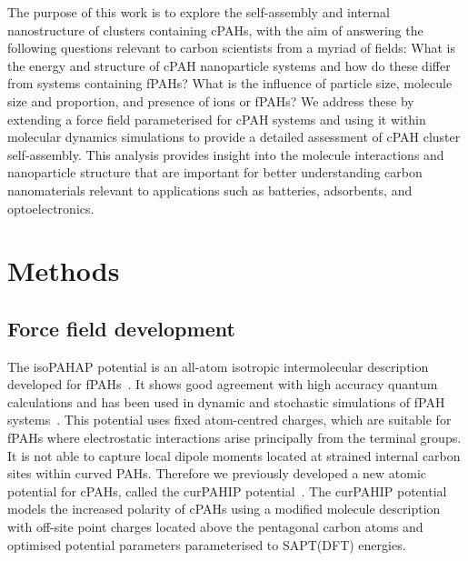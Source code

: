 The purpose of this work is to explore the self-assembly and internal nanostructure of clusters containing cPAHs, with the aim of answering the following questions relevant to carbon scientists from a myriad of fields: What is the energy and structure of cPAH nanoparticle systems and how do these differ from systems containing fPAHs? What is the influence of particle size, molecule size and proportion, and presence of ions or fPAHs?  We address these by extending a force field parameterised for cPAH systems and using it within molecular dynamics simulations to provide a detailed assessment of cPAH cluster self-assembly. This analysis provides insight into the molecule interactions and nanoparticle structure that are important for better understanding carbon nanomaterials relevant to applications such as batteries, adsorbents, and optoelectronics.

%
\section{Methods}
\subsection{Force field development}
The isoPAHAP potential is an all-atom isotropic intermolecular description developed for fPAHs~\cite{totton2010first}. It shows good agreement with high accuracy quantum calculations and has been used in dynamic and stochastic simulations of fPAH systems~\cite{Totton2012quantitative,bowal2019sphere,Grancic2016,Pascazio2017}. This potential uses fixed atom-centred charges, which are suitable for fPAHs where electrostatic interactions arise principally from the terminal groups. It is not able to capture local dipole moments located at strained internal carbon sites within curved PAHs. Therefore we previously developed a new atomic potential for cPAHs, called the curPAHIP potential~\cite{bowal2019ion}. The curPAHIP potential models the increased polarity of cPAHs using a modified molecule description with off-site point charges located above the pentagonal carbon atoms and optimised potential parameters parameterised to SAPT(DFT) energies.

